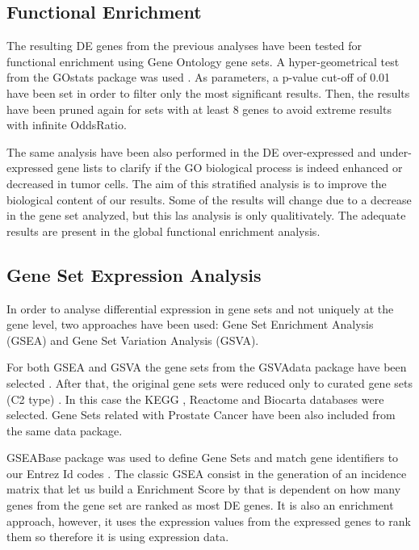 \documentclass[9pt,twocolumn,twoside]{gsajnl}
\begin{document}
\subsection*{Functional Enrichment}

The resulting DE genes from the previous analyses have been tested for functional enrichment using Gene Ontology gene sets. A hyper-geometrical test from the GOstats package was used \citep{GOstats}. As parameters, a p-value cut-off of 0.01 have been set in order to filter only the most significant results. Then, the results have been pruned again for sets with at least 8 genes to avoid extreme results with infinite OddsRatio.

The same analysis have been also performed in the DE over-expressed and under-expressed gene lists to clarify if the GO biological process is indeed enhanced or decreased in tumor cells. The aim of this stratified analysis is to improve the biological content of our results. Some of the results will change due to a decrease in the gene set analyzed, but this las analysis is only qualitivately. The adequate results are present in the global functional enrichment analysis. 


\subsection*{Gene Set Expression Analysis}
In order to analyse differential expression in gene sets and not uniquely at the gene level, two approaches have been used: Gene Set Enrichment Analysis (GSEA) and Gene Set Variation Analysis (GSVA).


For both GSEA and GSVA the gene sets from the GSVAdata package have been selected \citep{GSVAdata}. After that, the original gene sets were reduced only to curated gene sets  (C2 type) . In this case the KEGG  \citep{kanehisa2016kegg}, Reactome \citep{fabregat2016reactome} and   Biocarta \citep{nishimura2001biocarta} databases were selected. Gene Sets related with Prostate Cancer have been also included from the same data package.


GSEABase package was used to define Gene Sets and match gene identifiers to our Entrez Id codes \citep{GSEABase} . The classic GSEA consist in the generation of an incidence matrix that let us build a Enrichment Score by that is dependent on how many genes from the gene set are ranked as most DE genes. It is also an enrichment approach, however, it uses the expression values from the expressed genes to rank them so therefore it is using expression data.
\end{document}
